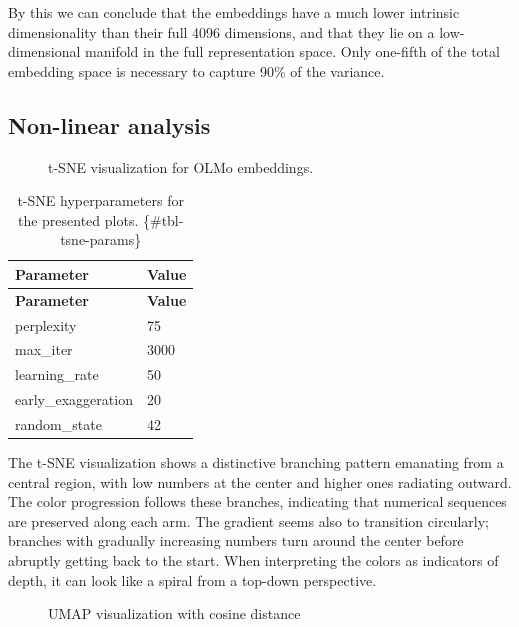\documentclass[
  a4paper, twoside, 10pt, titlepage]{book}
\makeatletter
\newcommand*\pandocbounded[1]{%
  \sbox\pandoc@box{#1}%
  \Gscale@div\@tempa{\textheight}{\dimexpr\ht\pandoc@box+\dp\pandoc@box\relax}%
  \Gscale@div\@tempb{\linewidth}{\wd\pandoc@box}%
  \ifdim\@tempb\p@<\@tempa\p@\let\@tempa\@tempb\fi%
  \ifdim\@tempa\p@<\p@\scalebox{\@tempa}{\usebox\pandoc@box}%
  \else\usebox{\pandoc@box}%
  \fi%
}
\makeatother
\begin{document}
By this we can conclude that the embeddings have a much lower intrinsic
dimensionality than their full 4096 dimensions, and that they lie on a
low-dimensional manifold in the full representation space. Only
one-fifth of the total embedding space is necessary to capture 90\% of
the variance.

\subsection{Non-linear analysis}\label{non-linear-analysis}

\begin{figure}
\centering
\pandocbounded{}
\caption{t-SNE visualization for OLMo embeddings.}\label{fig-olmo-tsne}
\end{figure}

\begin{longtable}[]{@{}ll@{}}
\caption{t-SNE hyperparameters for the presented plots.
\{\#tbl-tsne-params\}}\tabularnewline
\toprule\noalign{}
\textbf{Parameter} & \textbf{Value} \\
\midrule\noalign{}
\endfirsthead
\toprule\noalign{}
\textbf{Parameter} & \textbf{Value} \\
\midrule\noalign{}
\endhead
\bottomrule\noalign{}
\endlastfoot
perplexity & 75 \\
max\_iter & 3000 \\
learning\_rate & 50 \\
early\_exaggeration & 20 \\
random\_state & 42 \\
\end{longtable}

The t-SNE visualization shows a distinctive branching pattern emanating
from a central region, with low numbers at the center and higher ones
radiating outward. The color progression follows these branches,
indicating that numerical sequences are preserved along each arm. The
gradient seems also to transition circularly; branches with gradually
increasing numbers turn around the center before abruptly getting back
to the start. When interpreting the colors as indicators of depth, it
can look like a spiral from a top-down perspective.

\begin{figure}
\centering
\pandocbounded{}
\caption{UMAP visualization with cosine
distance}\label{fig-olmo-umap-cosine}
\end{figure}
\end{document}
